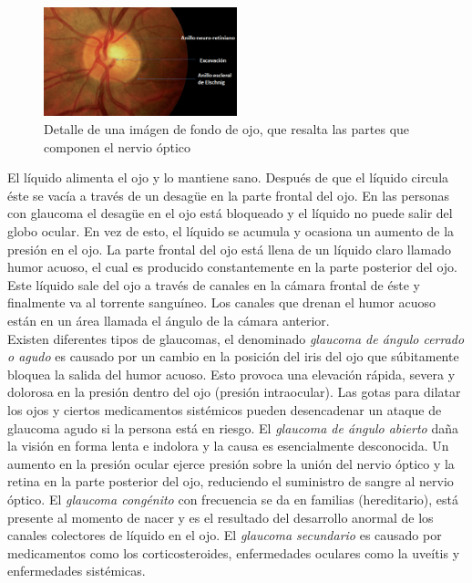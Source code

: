 \begin{description}
\begin{figure}[H]
	{
	\centering
	\includegraphics[width=0.5\textwidth]{Figures/nervioOptico}
	\caption[Glaucoma]{Detalle de una im\'agen de fondo de ojo, que resalta las partes que componen el nervio \'optico}
	\label{fig:Glaucoma}
	}
\end{figure}
El l\'iquido alimenta el ojo y lo mantiene sano. Despu\'es de que el l\'iquido circula \'este se vac\'ia a trav\'es de un desagüe en la parte frontal del ojo. En las personas con glaucoma el desagüe en el ojo est\'a bloqueado y el l\'iquido no puede salir del globo ocular. En vez de esto, el l\'iquido se acumula y ocasiona un aumento de la presi\'on en el ojo. 
La parte frontal del ojo est\'a llena de un l\'iquido claro llamado humor acuoso, el cual es producido constantemente en la parte posterior del ojo. Este l\'iquido sale del ojo a trav\'es de canales en la c\'amara frontal de \'este y finalmente va al torrente sangu\'ineo. Los canales que drenan el humor acuoso est\'an en un \'area llamada el \'angulo de la c\'amara anterior.\\
Existen diferentes tipos de glaucomas, el denominado \textit{glaucoma de \'angulo cerrado o agudo} es causado por un cambio en la posici\'on del iris del ojo que s\'ubitamente bloquea la salida del humor acuoso. Esto provoca una elevaci\'on r\'apida, severa y dolorosa en la presi\'on dentro del ojo (presi\'on intraocular). Las gotas para dilatar los ojos y ciertos medicamentos sist\'emicos pueden desencadenar un ataque de glaucoma agudo si la persona est\'a en riesgo. El \textit{glaucoma de \'angulo abierto} da\~na la visi\'on en forma lenta e indolora y la causa es esencialmente desconocida. Un aumento en la presi\'on ocular ejerce presi\'on sobre la uni\'on del nervio \'optico y la retina en la parte posterior del ojo, reduciendo el suministro de sangre al nervio \'optico. El \textit{glaucoma cong\'enito} con frecuencia se da en familias (hereditario), est\'a presente al momento de nacer y es el resultado del desarrollo anormal de los canales colectores de l\'iquido en el ojo. El \textit{glaucoma secundario} es causado por medicamentos como los corticosteroides, enfermedades oculares como la uve\'itis y enfermedades sist\'emicas.


\end{description}
